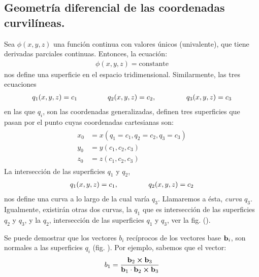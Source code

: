 \documentclass[12pt]{article}
\begin{document}
\subsection{Geometría diferencial de las coordenadas curvilíneas.}

Sea $\phi (x, y, z)$ una función continua con valores únicos (univalente), que tiene derivadas parciales continuas. Entonces, la ecuación:
\begin{align}
    \phi (x, y, z) = \text{constante}
    \label{eq:ecuacion_02_81}
\end{align} 
nos define una superficie en el espacio tridimensional. Similarmente, las tres ecuaciones 
\begin{align}
    q_{1} (x, y, z) = c_{1} \hspace{1.5cm} q_{2} (x, y, z) = c_{2}, \hspace{1.5cm} q_{3} (x, y, z) = c_{3}
    \label{eq:ecuacion_02_82}
\end{align}
en las que $q_{i}$, son las coordenadas generalizadas, definen tres superficies que pasan por el punto cuyas coordenadas cartesianas son:
\begin{align}
\begin{aligned}
x_{0} &= x \left( q_{1} = c_{1}, q_{2} = c_{2}, q_{3} = c_{3} \right) \\[0.5em]
y_{0} &= y \left( c_{1}, c_{2}, c_{3} \right) \\[0.5em]
z_{0} &= z \left( c_{1}, c_{2}, c_{3} \right)
\end{aligned}
\label{eq:ecuacion_02_83}
\end{align}
La intersección de las superficies $q_{1}$ y $q_{2}$, 
\begin{align*}
    q_{1} (x, y, z) = c_{1}, \hspace{1.5cm} q_{2} (x, y, z) = c_{2}
\end{align*}
nos define una curva a lo largo de la cual varía $q_{3}$. Llamaremos a ésta, \emph{curva} $q_{3}$. Igualmente, existirán otras dos curvas, la $q_{1}$ que es intersección de las superficies $q_{2}$ y $q_{3}$, y la $q_{2}$, intersección de las superficies $q_{1}$ y $q_{3}$, ver la fig. ().
\par
Se puede demostrar que los vectores $b_{i}$ recíprocos de los vectores base $\vb{b}_{i}$, son normales a las superficies $q_{i}$ (fig. ). Por ejemplo, sabemos que el vector:
\begin{align}
    b_{1} = \dfrac{\vb{b}_{2} \cp \vb{b}_{3}}{\vb{b}_{1} \cdot \vb{b}_{2} \cp \vb{b}_{3}}
    \label{eq:ecuacion_02_84}
\end{align}
\end{document}
